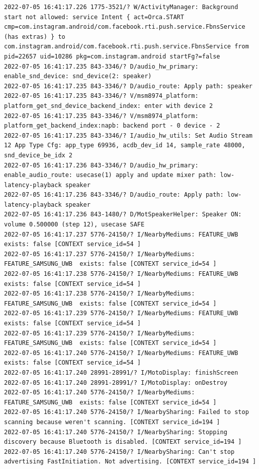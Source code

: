 \documentclass[a4paper,12pt]{book}
\begin{document}
\begin{lstlisting}
2022-07-05 16:41:17.226 1775-3521/? W/ActivityManager: Background start not allowed: service Intent { act=Orca.START cmp=com.instagram.android/com.facebook.rti.push.service.FbnsService (has extras) } to com.instagram.android/com.facebook.rti.push.service.FbnsService from pid=22657 uid=10286 pkg=com.instagram.android startFg?=false
2022-07-05 16:41:17.235 843-3346/? D/audio_hw_primary: enable_snd_device: snd_device(2: speaker)
2022-07-05 16:41:17.235 843-3346/? D/audio_route: Apply path: speaker
2022-07-05 16:41:17.235 843-3346/? V/msm8974_platform: platform_get_snd_device_backend_index: enter with device 2
2022-07-05 16:41:17.235 843-3346/? V/msm8974_platform: platform_get_backend_index:napb: backend port - 0 device - 2 
2022-07-05 16:41:17.235 843-3346/? I/audio_hw_utils: Set Audio Stream 12 App Type Cfg: app_type 69936, acdb_dev_id 14, sample_rate 48000, snd_device_be_idx 2
2022-07-05 16:41:17.236 843-3346/? D/audio_hw_primary: enable_audio_route: usecase(1) apply and update mixer path: low-latency-playback speaker
2022-07-05 16:41:17.236 843-3346/? D/audio_route: Apply path: low-latency-playback speaker
2022-07-05 16:41:17.236 843-1480/? D/MotSpeakerHelper: Speaker ON: volume 0.500000 (step 12), usecase SAFE
2022-07-05 16:41:17.237 5776-24150/? I/NearbyMediums: FEATURE_UWB exists: false [CONTEXT service_id=54 ]
2022-07-05 16:41:17.237 5776-24150/? I/NearbyMediums: FEATURE_SAMSUNG_UWB  exists: false [CONTEXT service_id=54 ]
2022-07-05 16:41:17.238 5776-24150/? I/NearbyMediums: FEATURE_UWB exists: false [CONTEXT service_id=54 ]
2022-07-05 16:41:17.238 5776-24150/? I/NearbyMediums: FEATURE_SAMSUNG_UWB  exists: false [CONTEXT service_id=54 ]
2022-07-05 16:41:17.239 5776-24150/? I/NearbyMediums: FEATURE_UWB exists: false [CONTEXT service_id=54 ]
2022-07-05 16:41:17.239 5776-24150/? I/NearbyMediums: FEATURE_SAMSUNG_UWB  exists: false [CONTEXT service_id=54 ]
2022-07-05 16:41:17.240 5776-24150/? I/NearbyMediums: FEATURE_UWB exists: false [CONTEXT service_id=54 ]
2022-07-05 16:41:17.240 28991-28991/? I/MotoDisplay: finishScreen
2022-07-05 16:41:17.240 28991-28991/? I/MotoDisplay: onDestroy
2022-07-05 16:41:17.240 5776-24150/? I/NearbyMediums: FEATURE_SAMSUNG_UWB  exists: false [CONTEXT service_id=54 ]
2022-07-05 16:41:17.240 5776-24150/? I/NearbySharing: Failed to stop scanning because weren't scanning. [CONTEXT service_id=194 ]
2022-07-05 16:41:17.240 5776-24150/? I/NearbySharing: Stopping discovery because Bluetooth is disabled. [CONTEXT service_id=194 ]
2022-07-05 16:41:17.240 5776-24150/? I/NearbySharing: Can't stop advertising FastInitiation. Not advertising. [CONTEXT service_id=194 ]

\end{lstlisting}
\end{document}
